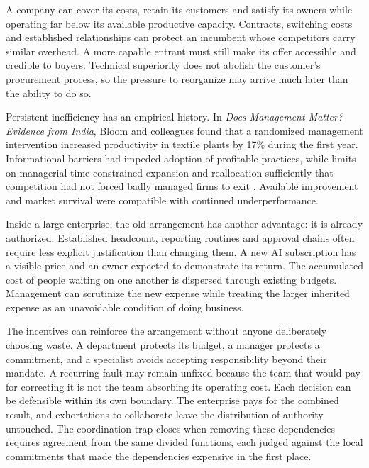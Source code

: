 \begin{EssayColumns}\GutterQuote

A company can cover its costs, retain its customers and satisfy its
owners while operating far below its available productive capacity.
Contracts, switching costs and established relationships can protect an
incumbent whose competitors carry similar overhead. A more capable
entrant must still make its offer accessible and credible to buyers.
Technical superiority does not abolish the customer's procurement
process, so the pressure to reorganize may arrive much later than the
ability to do so.

Persistent inefficiency has an empirical history. In \emph{Does
Management Matter? Evidence from India}, Bloom and colleagues found that
a randomized management intervention increased productivity in textile
plants by 17\% during the first year. Informational barriers had impeded
adoption of profitable practices, while limits on managerial time
constrained expansion and reallocation sufficiently that competition had
not forced badly managed firms to exit \citep{bloom2013management}.
Available improvement and market survival were compatible with continued
underperformance.

Inside a large enterprise, the old arrangement has another advantage: it
is already authorized. Established headcount, reporting routines and
approval chains often require less explicit justification than changing
them. A new AI subscription has a visible price and an owner expected to
demonstrate its return. The accumulated cost of people waiting on one
another is dispersed through existing budgets. Management can scrutinize
the new expense while treating the larger inherited expense as an
unavoidable condition of doing business.

\NextGutterColumn

The incentives can reinforce the arrangement without anyone deliberately
choosing waste. A department protects its budget, a manager protects a
commitment, and a specialist avoids accepting responsibility beyond
their mandate. A recurring fault may remain unfixed because the team
that would pay for correcting it is not the team absorbing its operating
cost. Each decision can be defensible within its own boundary. The
enterprise pays for the combined result, and exhortations to collaborate
leave the distribution of authority untouched. The coordination trap
closes when removing these dependencies requires agreement from the same
divided functions, each judged against the local commitments that made
the dependencies expensive in the first place.


\end{EssayColumns}
